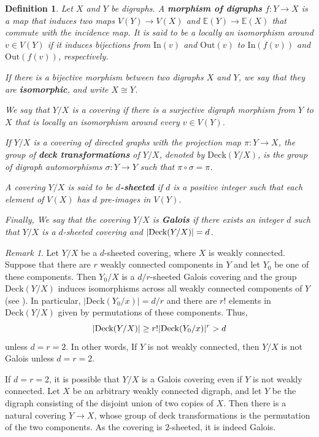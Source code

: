 \documentclass[11pt]{amsart}
\newtheorem{defn}[theorem]{Definition}
\numberwithin{equation}{section}
\theoremstyle{remark}
\newtheorem{remark}[theorem]{Remark}
\newcommand{\EE}{\mathbb{E}}
\newcommand{\?}{\stackrel{?}{=}}
\newcommand{\In}{\mathrm{In}}
\newcommand{\Out}{\mathrm{Out}}
\newcommand{\Deck}{\mathrm{Deck}}
\begin{document}
\begin{defn}
Let $X$ and $Y$ be digraphs. 
A \textbf{morphism of digraphs} $
f:Y \to X$
is a map that induces two maps $ V(Y) \to V(X)$ and $\EE(Y)\to \EE(X)$ that commute with the incidence map. It is said to be a locally an isomorphism around $v\in V(Y)$ if it induces bijections from $\In(v)$ and $\Out(v)$ to $\In(f(v))$ and $\Out(f(v))$, respectively.

If there is a bijective morphism between two digraphs $X$ and $Y$, we say that they are \textbf{isomorphic}, and write $X\cong Y$.

We say that $Y/X$ is a covering if there is a surjective digraph morphism from $Y$ to $X$ that is locally an isomorphism around every $v\in V(Y)$. 

    If $Y/X$ is a covering of directed graphs with the projection map $\pi:Y\to X$, the group of \textbf{deck transformations} of $Y/X$, denoted by $\Deck(Y/X)$, is the group of digraph automorphisms $\sigma:Y\to Y$ such that $\pi\circ\sigma=\pi$. %
    
    A covering $Y/X$ is said to be \textbf{$d$-sheeted} if $d$ is a positive integer such that each element of $V(X)$ has $d$ pre-images in $V(Y)$.
    
Finally, We say that the covering $Y/X$ is \textbf{Galois}  if there exists an integer $d$ such that $Y/X$ is a $d$-sheeted covering and $\vert \textup{Deck}(Y/X)\vert =d$.
\end{defn}


\begin{remark}\label{rk:connectedness}
Let $Y/X$ be a $d$-sheeted covering, where $X$ is weakly connected. Suppose that there are $r$ weakly connected components in $Y$ and let $Y_0$ be one of these components. Then $Y_0/X$ is a $d/r$-sheeted Galois covering and the group $\Deck(Y/X)$ induces isomorphisms across all weakly connected components of $Y$ (see \cite[Proposition~2.4]{LM2}). In particular, $|\Deck(Y_0/x)|=d/r$ and there are $r!$ elements in $\Deck(Y/X)$ given by permutations of these components.  Thus, 
\[\vert \textup{Deck}(Y/X)\vert \ge r!|\Deck(Y_0/x)|^r>d\]
unless $d=r=2$. In other words, If $Y$ is not weakly connected, then $Y/X$ is not Galois unless $d=r=2$.

If $d=r=2$, it is possible that $Y/X$ is a Galois covering even if $Y$ is not weakly connected. Let $X$ be an arbitrary weakly connected digraph, and let $Y$ be the digraph consisting of the disjoint union of two copies of $X$. Then there is a natural covering $Y\to X$, whose group of deck transformations is the permutation of the two components. As the covering is $2$-sheeted, it is indeed Galois. 
\end{remark}
\end{document}
